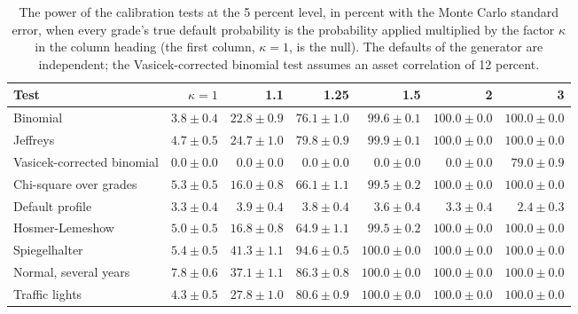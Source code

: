 \begin{table}[htbp]
\centering
\setlength{\tabcolsep}{3pt}
\footnotesize
\caption{The power of the calibration tests at the 5 percent level, in percent with the Monte Carlo standard error, when every grade's true default probability is the probability applied multiplied by the factor $\kappa$ in the column heading (the first column, $\kappa=1$, is the null). The defaults of the generator are independent; the Vasicek-corrected binomial test assumes an asset correlation of 12 percent.}
\label{tab:vt-miscal}
\begin{tabular}{lrrrrrr}
\toprule
Test & $\kappa=1$ & 1.1 & 1.25 & 1.5 & 2 & 3 \\
\midrule
Binomial & $3.8\pm0.4$ & $22.8\pm0.9$ & $76.1\pm1.0$ & $99.6\pm0.1$ & $100.0\pm0.0$ & $100.0\pm0.0$ \\
Jeffreys & $4.7\pm0.5$ & $24.7\pm1.0$ & $79.8\pm0.9$ & $99.9\pm0.1$ & $100.0\pm0.0$ & $100.0\pm0.0$ \\
Vasicek-corrected binomial & $0.0\pm0.0$ & $0.0\pm0.0$ & $0.0\pm0.0$ & $0.0\pm0.0$ & $0.0\pm0.0$ & $79.0\pm0.9$ \\
Chi-square over grades & $5.3\pm0.5$ & $16.0\pm0.8$ & $66.1\pm1.1$ & $99.5\pm0.2$ & $100.0\pm0.0$ & $100.0\pm0.0$ \\
Default profile & $3.3\pm0.4$ & $3.9\pm0.4$ & $3.8\pm0.4$ & $3.6\pm0.4$ & $3.3\pm0.4$ & $2.4\pm0.3$ \\
Hosmer-Lemeshow & $5.0\pm0.5$ & $16.8\pm0.8$ & $64.9\pm1.1$ & $99.5\pm0.2$ & $100.0\pm0.0$ & $100.0\pm0.0$ \\
Spiegelhalter & $5.4\pm0.5$ & $41.3\pm1.1$ & $94.6\pm0.5$ & $100.0\pm0.0$ & $100.0\pm0.0$ & $100.0\pm0.0$ \\
Normal, several years & $7.8\pm0.6$ & $37.1\pm1.1$ & $86.3\pm0.8$ & $100.0\pm0.0$ & $100.0\pm0.0$ & $100.0\pm0.0$ \\
Traffic lights & $4.3\pm0.5$ & $27.8\pm1.0$ & $80.6\pm0.9$ & $100.0\pm0.0$ & $100.0\pm0.0$ & $100.0\pm0.0$ \\
\bottomrule
\end{tabular}
\end{table}
